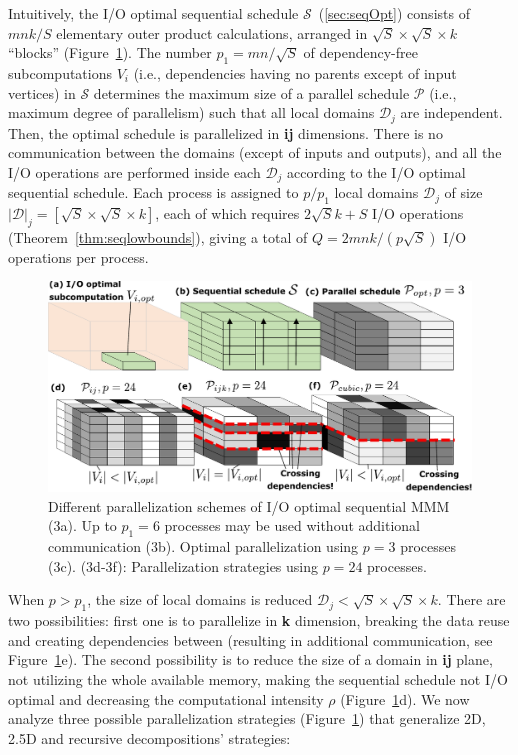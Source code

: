 \documentclass[sigplan,review,anonymous,10pt]{acmart}\settopmatter{printfolios=true,printccs=false,printacmref=false}
\begin{document}
Intuitively, the 
I/O optimal sequential schedule $\mathcal{S}$~(\cref{sec:seqOpt})
consists of $mnk/S$ elementary outer product calculations, arranged in
$\sqrt{S} \times \sqrt{S} \times k$ ``blocks'' 
(Figure~\ref{fig:mmmParallelization}). The number $p_1 = mn/\sqrt{S}$ of 
dependency-free subcomputations 
$V_i$
(i.e., dependencies having no parents except of input vertices) in $\mathcal{S}$ 
determines the maximum size of a parallel schedule $\mathcal{P}$ (i.e., maximum 
degree 
of parallelism) such that all local domains 
$\mathcal{D}_j$ are independent. Then, the optimal schedule is parallelized in 
\textbf{ij} dimensions. There is no communication between the 
domains (except of inputs and outputs), and all the I/O operations are 
performed inside each $\mathcal{D}_j$ according to the I/O optimal sequential 
schedule. Each process is  assigned to $p/p_1$ local domains
$\mathcal{D}_j$ of size 
$|\mathcal{D}|_j = [\sqrt{S} \times \sqrt{S} \times k]$, each of which requires 
$2\sqrt{S}k + S$ I/O 
operations (Theorem~\ref{thm:seqlowbounds}), giving a total of $Q = 
2mnk/(p\sqrt{S})$ I/O operations per process.


\begin{figure}
	\includegraphics[width=\columnwidth]{figures/mmm_parallelization}
	\caption{Different parallelization schemes of I/O optimal sequential MMM 
	(3a). 
	Up to $p_1 = 6$ processes may 
		be 
		used without additional communication (3b). 
		Optimal 
		parallelization using $p=3$ processes (3c). 
		(3d-3f):  Parallelization strategies 
		using $p=24$ processes.} 
	\label{fig:mmmParallelization}
\end{figure}

When $p > p_1$, the size of local domains is reduced $\mathcal{D}_j < \sqrt{S} 
\times \sqrt{S} \times k $. There are two possibilities: first one is to 
parallelize in \textbf{k} dimension, breaking the data reuse and creating
dependencies between (resulting in additional communication, see
Figure~\ref{fig:mmmParallelization}e). The second possibility is to reduce the 
size of a domain in \textbf{ij} plane, not utilizing the whole available
memory, making the sequential schedule not I/O optimal and decreasing the
computational intensity $\rho$ (Figure~\ref{fig:mmmParallelization}d). We
  now analyze three possible parallelization
  strategies (Figure~\ref{fig:mmmParallelization}) that generalize 2D, 2.5D and 
  recursive decompositions' strategies:
\end{document}

